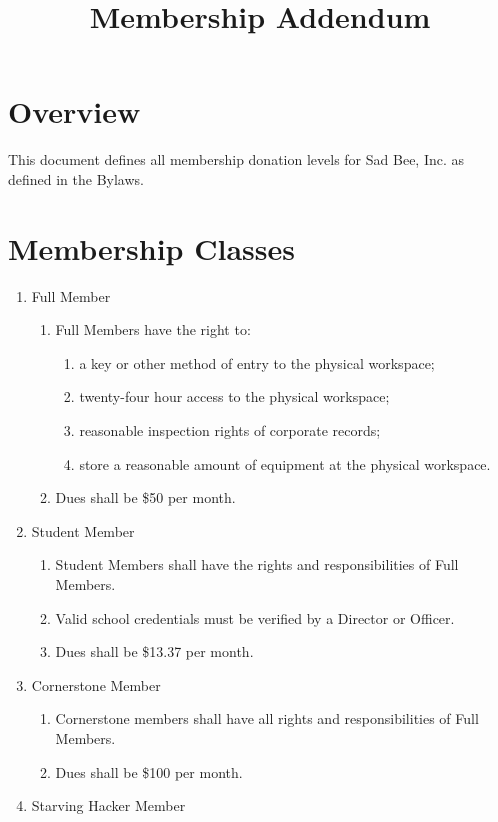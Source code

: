 \documentclass[11pt, oneside]{article} %
\title{Membership Addendum}
\begin{document}
\maketitle

\section{Overview}
This document defines all membership donation levels for Sad Bee, Inc. as defined in the Bylaws.

\section{Membership Classes}
\begin{enumerate}
	\item Full Member
	\begin{enumerate}
		\item Full Members have the right to:
		\begin{enumerate}
			\item a key or other method of entry to the physical workspace;
			\item twenty-four hour access to the physical workspace;
			\item reasonable inspection rights of corporate records;
			\item store a reasonable amount of equipment at the physical workspace.
		\end{enumerate}
		\item Dues shall be \$50 per month.
	\end{enumerate}
	\item Student Member
	\begin{enumerate}
		\item Student Members shall have the rights and responsibilities of Full Members.
		\item Valid school credentials must be verified by a Director or Officer.
		\item Dues shall be \$13.37 per month.
	\end{enumerate}
	\item Cornerstone Member
	\begin{enumerate}
		\item Cornerstone members shall have all rights and responsibilities of Full Members.
		\item Dues shall be \$100 per month.
	\end{enumerate}
	\item Starving Hacker Member

\end{enumerate}
\end{document}
